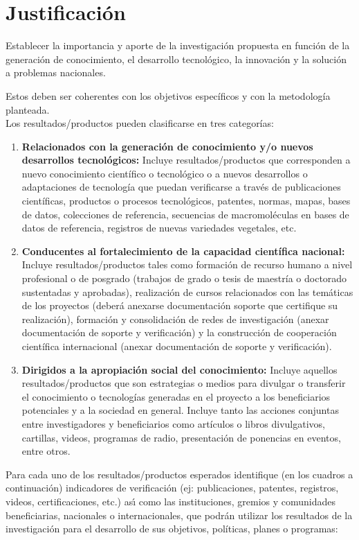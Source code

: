 \section{Justificación}
\begin{instrucciones}
  Establecer la importancia y aporte de la investigación
propuesta en función de la generación de conocimiento, el desarrollo tecnológico, la innovación y
la solución a problemas nacionales.
\end{instrucciones}


\begin{instrucciones}
  Estos deben ser coherentes con los objetivos específicos y con la
  metodología planteada.\\
  Los resultados/productos pueden clasificarse en tres categorías:
  \begin{enumerate}
  \item \textbf{Relacionados con la generación de conocimiento y/o nuevos desarrollos
 tecnológicos:} Incluye resultados/productos que corresponden a nuevo
 conocimiento científico o tecnológico o a nuevos desarrollos o adaptaciones de
 tecnología que puedan verificarse a través de publicaciones científicas,
 productos o procesos tecnológicos, patentes, normas, mapas, bases de datos,
 colecciones de referencia, secuencias de macromoléculas en bases de datos de
 referencia, registros de nuevas variedades vegetales, etc.
\item \textbf{Conducentes al fortalecimiento de la capacidad científica
  nacional:} Incluye resultados/productos tales como formación de
  recurso humano a nivel profesional o de posgrado (trabajos de grado
  o tesis de maestría o doctorado sustentadas y aprobadas),
  realización de cursos relacionados con las temáticas de los
  proyectos (deberá anexarse documentación soporte que certifique su
  realización), formación y consolidación de redes de investigación
  (anexar documentación de soporte y verificación) y la construcción
  de cooperación científica internacional (anexar documentación de
  soporte y verificación).
\item \textbf{Dirigidos a la apropiación social del conocimiento:}
  Incluye aquellos resultados/productos que son estrategias o medios
  para divulgar o transferir el conocimiento o tecnologías generadas
  en el proyecto a los beneficiarios potenciales y a la sociedad en
  general. Incluye tanto las acciones conjuntas entre investigadores y
  beneficiarios como artículos o libros divulgativos, cartillas,
  videos, programas de radio, presentación de ponencias en eventos,
  entre otros.
  \end{enumerate}

  Para cada uno de los resultados/productos esperados identifique (en
  los cuadros a continuación) indicadores de verificación (ej:
  publicaciones, patentes, registros, videos, certificaciones, etc.)
  as\'\i{} como las instituciones, gremios y comunidades beneficiarias,
  nacionales o internacionales, que podrán utilizar los resultados de
  la investigación para el desarrollo de sus objetivos, políticas,
  planes o programas:

\end{instrucciones}

